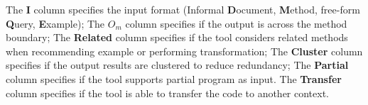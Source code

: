 \begin{table}[ht]
\begin{center}
{%
The {\bf I} column specifies the input  format (Informal {\bf D}ocument, {\bf M}ethod, free-form {\bf Q}uery, {\bf E}xample); 
The {\bf $O_{m}$} column specifies if the  output is across the method boundary; The {\bf Related} column specifies if the tool considers related methods when recommending example or performing transformation; 
The {\bf Cluster} column specifies if the output results are clustered to reduce redundancy; 
The {\bf Partial} column specifies if the tool supports partial program as input.
The {\bf Transfer} column specifies if the tool is able to transfer the code to another context.
}
 \end{center}
\end{table}




